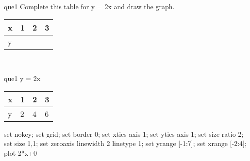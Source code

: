 \documentclass[13.5pt, varwidth=true]{beamer}
\begin{document}
\begin{frame}[shrink=19,fragile]
	\begin{beamercolorbox}[rounded=true, left, shadow=true,wd=14.8cm]{que1}
		 Complete this table for y = 2x and draw the graph. \\[0.3cm] \renewcommand{\arraystretch}{1.2}\begin{tabular}{|C|C|C|C|} \hline x & 1 & 2 & 3 \\ \hline y & & & \\ \hline \end{tabular}\\[0.3cm]
	\end{beamercolorbox}
\end{frame}
\begin{frame}[shrink=19,fragile]
	\begin{beamercolorbox}[rounded=true, left, shadow=true,wd=14.8cm]{que1}
		y = 2x\renewcommand{\arraystretch}{1.2}\begin{tabular}{|C|C|C|C|} \hline x & 1 & 2 & 3 \\ \hline y & 2 & 4 & 6\\ \hline \end{tabular}\begin{gnuplot}[terminal=pdf] set nokey; set grid; set border 0; set xtics axis 1; set ytics axis 1; set size ratio 2; set size 1,1; set zeroaxis linewidth 2 linetype 1; set yrange [-1:7]; set xrange [-2:4]; plot 2*x+0 \end{gnuplot}
	\end{beamercolorbox}
\end{frame}
\end{document}
